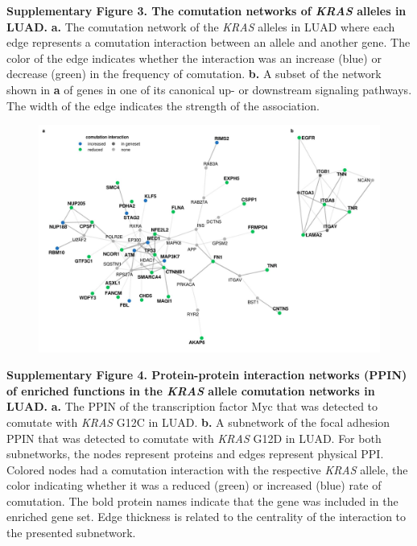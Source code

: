 \documentclass[english, 10pt, letterpaper]{article}
\newcommand{\KRAS}{\emph{KRAS}}
\begin{document}
\noindent \textbf{Supplementary Figure 3. The comutation networks of \KRAS{} alleles in LUAD.}
\textbf{a.} The comutation network of the \KRAS{} alleles in LUAD where each edge represents a comutation interaction between an allele and another gene. The color of the edge indicates whether the interaction was an increase (blue) or decrease (green) in the frequency of comutation.
\textbf{b.} A subset of the network shown in \textbf{a} of genes in one of its canonical up- or downstream signaling pathways. The width of the edge indicates the strength of the association.
\newpage


\begin{figure}[h!]
\centering
\includegraphics[width=180mm]{figures/Supp_Fig_4.jpeg}
\label{sfig:luad-comutation-supp}
\end{figure}

\noindent \textbf{Supplementary Figure 4. Protein-protein interaction networks (PPIN) of enriched functions in the \KRAS{} allele comutation networks in LUAD.}
\textbf{a.} The PPIN of the transcription factor Myc that was detected to comutate with \KRAS{} G12C in LUAD.
\textbf{b.} A subnetwork of the focal adhesion PPIN that was detected to comutate with \KRAS{} G12D in LUAD. For both subnetworks, the nodes represent proteins and edges represent physical PPI. Colored nodes had a comutation interaction with the respective \KRAS{} allele, the color indicating whether it was a reduced (green) or increased (blue) rate of comutation. The bold protein names indicate that the gene was included in the enriched gene set. Edge thickness is related to the centrality of the interaction to the presented subnetwork.
\newpage
\end{document}
